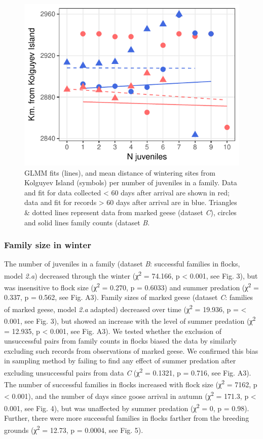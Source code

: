 \documentclass[10pt,twocolumn]{paper}
\begin{document}
\begin{figure}
\includegraphics[width = 1\linewidth]{dist_fam.pdf}
\caption{{\small GLMM fits (lines), and mean distance of wintering sites from Kolguyev Island (symbols) per number of juveniles in a family. Data and fit for
data collected \textless{} 60 days after arrival are shown in red; data and fit for records \textgreater{} 60 days after arrival are in blue.
Triangles \& dotted lines represent data from marked geese (dataset \emph{C}), circles and solid lines family counts (dataset \emph{B}.}}
\end{figure}

\subsubsection{Family size in winter}\label{family-size-in-winter}

The number of juveniles in a family (dataset \emph{B}: successful
families in flocks, model \emph{2.a}) decreased through the winter
(χ\textsuperscript{2} = 74.166, p \textless{} 0.001, see Fig. 3), but
was insensitive to flock size (χ\textsuperscript{2} = 0.270, p = 0.6033)
and summer predation (χ\textsuperscript{2} = 0.337, p = 0.562, see Fig.
A3). Family sizes of marked geese (dataset \emph{C}: families of marked
geese, model \emph{2.a} adapted) decreased over time
(χ\textsuperscript{2} = 19.936, p = \textless{} 0.001, see Fig. 3), but
showed an increase with the level of summer predation
(χ\textsuperscript{2} = 12.935, p \textless{} 0.001, see Fig. A3). We
tested whether the exclusion of unsuccessful pairs from family counts in
flocks biased the data by similarly excluding such records from
observations of marked geese. We confirmed this bias in sampling method
by failing to find any effect of summer predation after excluding
unsuccessful pairs from data \emph{C} (χ\textsuperscript{2} = 0.1321, p
= 0.716, see Fig. A3). The number of successful families in flocks
increased with flock size (χ\textsuperscript{2} = 7162, p \textless{}
0.001), and the number of days since goose arrival in autumn
(χ\textsuperscript{2} = 171.3, p \textless{} 0.001, see Fig. 4), but was
unaffected by summer predation (χ\textsuperscript{2} = 0, p = 0.98).
Further, there were more successful families in flocks farther from the
breeding grounds (χ\textsuperscript{2} = 12.73, p = 0.0004, see Fig. 5).
\end{document}
